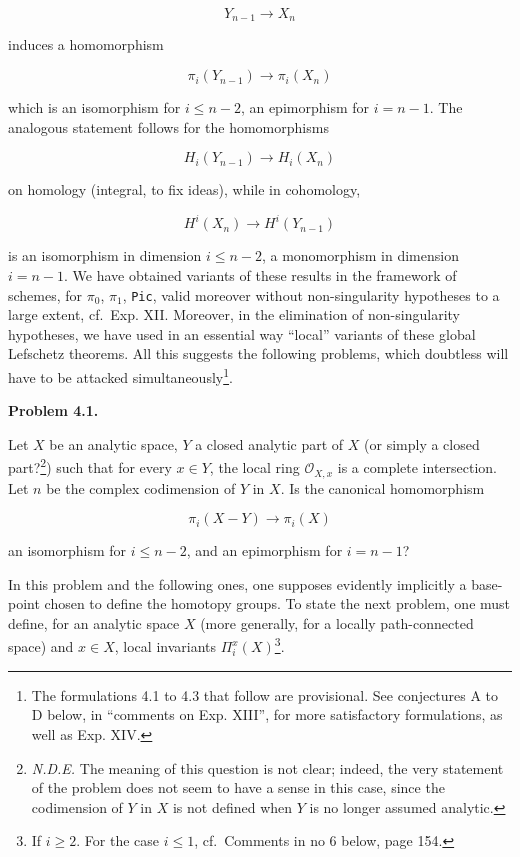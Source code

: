 \documentclass[
]{article}
\begin{document}
\[
Y_{n-1} \to X_{n}
\]

induces a homomorphism

\[
\pi_{i}(Y_{n-1}) \to \pi_{i}(X_{n})
\]

which is an isomorphism for \(i \leqslant n - 2\), an epimorphism for
\(i = n - 1\). The analogous statement follows for the homomorphisms

\[
H_{i}(Y_{n-1}) \to H_{i}(X_{n})
\]

on homology (integral, to fix ideas), while in cohomology,

\[
H^{i}(X_{n}) \to H^{i}(Y_{n-1})
\]

is an isomorphism in dimension \(i \leqslant n - 2\), a monomorphism in
dimension \(i = n - 1\). We have obtained variants of these results in
the framework of schemes, for \(\pi_{0}\), \(\pi_{1}\), \texttt{Pic},
valid moreover without non-singularity hypotheses to a large extent,
cf.~Exp. XII. Moreover, in the elimination of non-singularity
hypotheses, we have used in an essential way ``local'' variants of these
global Lefschetz theorems. All this suggests the following problems,
which doubtless will have to be attacked simultaneously\footnote{The
  formulations 4.1 to 4.3 that follow are provisional. See conjectures A
  to D below, in ``comments on Exp. XIII'', for more satisfactory
  formulations, as well as Exp. XIV.}.

\textbf{Problem 4.1.}

Let \(X\) be an analytic space, \(Y\) a closed analytic part of \(X\)
(or simply a closed part?\footnote{\emph{N.D.E.} The meaning of this
  question is not clear; indeed, the very statement of the problem does
  not seem to have a sense in this case, since the codimension of \(Y\)
  in \(X\) is not defined when \(Y\) is no longer assumed analytic.})
such that for every \(x \in Y\), the local ring \(\mathcal{O}_{X,x}\) is
a complete intersection. Let \(n\) be the complex codimension of \(Y\)
in \(X\). Is the canonical homomorphism

\[
\pi_{i}(X - Y) \to \pi_{i}(X)
\]

an isomorphism for \(i \leqslant n - 2\), and an epimorphism for
\(i = n - 1\)?

In this problem and the following ones, one supposes evidently
implicitly a base-point chosen to define the homotopy groups. To state
the next problem, one must define, for an analytic space \(X\) (more
generally, for a locally path-connected space) and \(x \in X\), local
invariants \(\Pi^{x}_{i}(X)\)\footnote{If \(i \geqslant 2\). For the
  case \(i \leqslant 1\), cf.~Comments in no 6 below, page 154.}.
\end{document}
